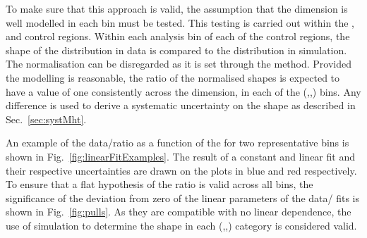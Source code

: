 
To make sure that this approach is valid, the assumption that the \MHT
dimension is well modelled in each bin must be tested. This testing is
carried out within the \gj, \mj and \mmj control regions. Within each
analysis bin of each of the control regions, the shape of the \MHT
distribution in data is compared to the distribution in \MC
simulation. The normalisation can be disregarded as it is set through the
\TF method.  Provided the modelling is reasonable, the ratio of the
normalised shapes is expected to have a value of one consistently
across the \MHT dimension, in each of the (\HT,\nj,\nb) bins. Any
difference is used to derive a systematic uncertainty on the \MHT
shape as described in Sec.~\ref{sec:systMht}. 

An example of the data/\MC ratio as a function of the \MHT for two
representative bins is shown in Fig.~\ref{fig:linearFitExamples}. The
result of a constant and linear fit and their respective uncertainties
are drawn on the plots in blue and red respectively. To ensure that a
flat hypothesis of the ratio is valid across all bins, the significance
of the deviation from zero of the linear parameters of the data/\MC
fits is shown in Fig.~\ref{fig:pulls}. As they are compatible with no
linear dependence, the use of simulation to determine the \MHT shape
in each (\HT,\nj,\nb) category is considered valid.

